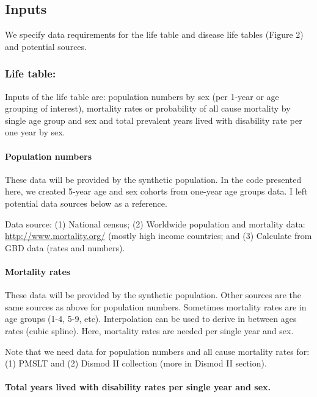 \documentclass[]{article}
\let\oldparagraph\paragraph
\renewcommand{\paragraph}[1]{\oldparagraph{#1}\mbox{}}
\begin{document}
\subsection{Inputs}\label{inputs}

We specify data requirements for the life table and disease life tables
(Figure 2) and potential sources.

\subsubsection{\texorpdfstring{\textbf{Life
table}:}{Life table:}}\label{life-table}

Inputs of the life table are: population numbers by sex (per 1-year or
age grouping of interest), mortality rates or probability of all cause
mortality by single age group and sex and total prevalent years lived
with disability rate per one year by sex.

\paragraph{Population numbers}\label{population-numbers}

These data will be provided by the synthetic population. In the code
presented here, we created 5-year age and sex cohorts from one-year age
groups data. I left potential data sources below as a reference.

Data source: (1) National census; (2) Worldwide population and mortality
data: \url{http://www.mortality.org/} (mostly high income countries; and
(3) Calculate from GBD data (rates and numbers).

\paragraph{Mortality rates}\label{mortality-rates}

These data will be provided by the synthetic population. Other sources
are the same sources as above for population numbers. Sometimes
mortality rates are in age groups (1-4, 5-9, etc). Interpolation can be
used to derive in between ages rates (cubic spline). Here, mortality
rates are needed per single year and sex.

Note that we need data for population numbers and all cause mortality
rates for: (1) PMSLT and (2) Dismod II collection (more in Dismod II
section).

\paragraph{Total years lived with disability rates per single year and
sex.}\label{total-years-lived-with-disability-rates-per-single-year-and-sex.}
\end{document}
